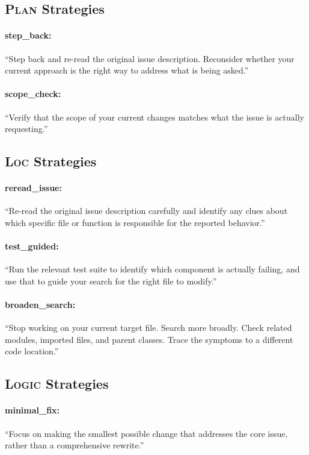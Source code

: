 \documentclass[11pt]{article}
\begin{document}
\subsection{\textsc{Plan} Strategies}

\paragraph{step\_back:} ``Step back and re-read the original issue description. Reconsider whether your current approach is the right way to address what is being asked.''

\paragraph{scope\_check:} ``Verify that the scope of your current changes matches what the issue is actually requesting.''

\subsection{\textsc{Loc} Strategies}

\paragraph{reread\_issue:} ``Re-read the original issue description carefully and identify any clues about which specific file or function is responsible for the reported behavior.''

\paragraph{test\_guided:} ``Run the relevant test suite to identify which component is actually failing, and use that to guide your search for the right file to modify.''

\paragraph{broaden\_search:} ``Stop working on your current target file. Search more broadly. Check related modules, imported files, and parent classes. Trace the symptoms to a different code location.''

\subsection{\textsc{Logic} Strategies}

\paragraph{minimal\_fix:} ``Focus on making the smallest possible change that addresses the core issue, rather than a comprehensive rewrite.''
\end{document}
